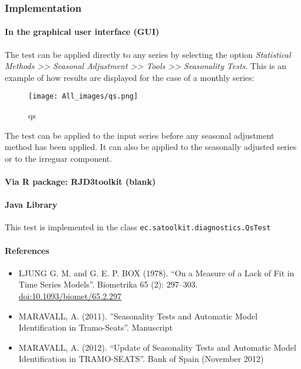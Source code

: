 \documentclass[
]{book}
\providecommand{\tightlist}{%
  \setlength{\itemsep}{0pt}\setlength{\parskip}{0pt}}
\begin{document}
\hypertarget{implementation}{%
\subsubsection{Implementation}\label{implementation}}

\hypertarget{in-the-graphical-user-interface-gui}{%
\paragraph{In the graphical user interface (GUI)}\label{in-the-graphical-user-interface-gui}}

The test can be applied directly to any series by selecting the
option \emph{Statistical Methods \textgreater\textgreater{} Seasonal Adjustment \textgreater\textgreater{} Tools \textgreater\textgreater{} Seasonality Tests}. This is
an example of how results are displayed for the case of a monthly series:

\begin{figure}
\centering
\texttt{[image: All\_images/qs.png]}
\caption{qs}
\end{figure}

The test can be applied to the input series before any seasonal adjustment method has been applied. It can also be applied to the seasonally
adjusted series or to the irreguar component.

\hypertarget{via-r-package-rjd3toolkit-blank}{%
\paragraph{Via R package: RJD3toolkit (blank)}\label{via-r-package-rjd3toolkit-blank}}

\hypertarget{java-library}{%
\paragraph{Java Library}\label{java-library}}

This test is implemented in the class \texttt{ec.satoolkit.diagnostics.QsTest}

\hypertarget{references-1}{%
\paragraph{References}\label{references-1}}

\begin{itemize}
\tightlist
\item
  LJUNG G. M. and G. E. P. BOX (1978). ``On a Measure of a Lack of Fit in Time Series Models''. Biometrika 65 (2): 297--303. \url{doi:10.1093/biomet/65.2.297}
\item
  MARAVALL, A. (2011). ''Seasonality Tests and Automatic Model Identification in Tramo-Seats''. Manuscript
\item
  MARAVALL, A. (2012). ``Update of Seasonality Tests and Automatic Model Identification in TRAMO-SEATS''. Bank of Spain (November 2012)
\end{itemize}
\end{document}
